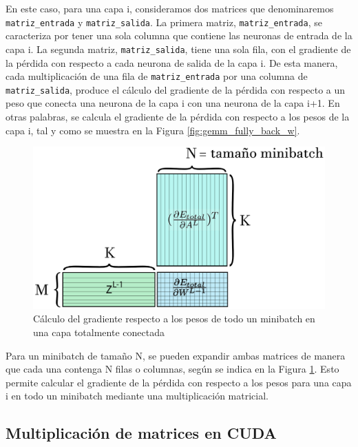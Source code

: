 En este caso, para una capa i, consideramos dos matrices que denominaremos \texttt{matriz\_entrada} y \texttt{matriz\_salida}. La primera matriz, \texttt{matriz\_entrada}, se caracteriza por tener una sola columna que contiene las neuronas de entrada de la capa i. La segunda matriz, \texttt{matriz\_salida}, tiene una sola fila, con el gradiente de la pérdida con respecto a cada neurona de salida de la capa i. De esta manera, cada multiplicación de una fila de \texttt{matriz\_entrada} por una columna de \texttt{matriz\_salida}, produce el cálculo del gradiente de la pérdida con respecto a un peso que conecta una neurona de la capa i con una neurona de la capa i+1. En otras palabras, se calcula el gradiente de la pérdida con respecto a los pesos de la capa i, tal y como se muestra en la Figura \ref{fig:gemm_fully_back_w}.

\begin{figure}[H]
	\centering
	\includegraphics[scale=0.25]{imagenes/gemm_fully_back_w_minibatch.jpg}  
	\caption{Cálculo del gradiente respecto a los pesos de todo un minibatch en una capa totalmente conectada}
	\label{fig:gemm_fully_back_w_minibatch}
\end{figure}

Para un minibatch de tamaño N, se pueden expandir ambas matrices de manera que cada una contenga N filas o columnas, según se indica en la Figura \ref{fig:gemm_fully_back_w_minibatch}. Esto permite calcular el gradiente de la pérdida con respecto a los pesos para una capa i en todo un minibatch mediante una multiplicación matricial.

\subsection{Multiplicación de matrices en CUDA}

